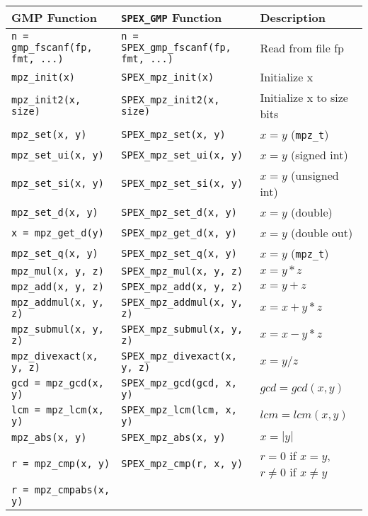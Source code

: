 \documentclass[12pt]{report}
\theoremstyle{definition}
\begin{document}
{\begin{center}
\begin{tabular}{|l|l|l|}
{\bf GMP Function} & \verb|SPEX_GMP| {\bf Function} & {\bf Description} \\
\hline\hline
\verb|n = gmp_fscanf(fp, fmt, ...)|
    & \verb|n = SPEX_gmp_fscanf(fp, fmt, ...)|
    & Read from file fp \\ \hline
\verb|mpz_init(x)|
    & \verb|SPEX_mpz_init(x)|
    & Initialize x \\ \hline
\verb|mpz_init2(x, size)|
    & \verb|SPEX_mpz_init2(x, size)|
    & Initialize x to size bits \\ \hline
\verb|mpz_set(x, y)|
    & \verb|SPEX_mpz_set(x, y)| 
    & $x = y$ (\verb|mpz_t|) \\ \hline
\verb|mpz_set_ui(x, y)|
    & \verb|SPEX_mpz_set_ui(x, y)|
    & $x = y$ (signed int) \\ \hline
\verb|mpz_set_si(x, y)|
    & \verb|SPEX_mpz_set_si(x, y)|
    & $x = y$ (unsigned int) \\ \hline
\verb|mpz_set_d(x, y)|
    & \verb|SPEX_mpz_set_d(x, y)|
    & $x = y$ (double)\\ \hline
\verb|x = mpz_get_d(y)|
    & \verb|SPEX_mpz_get_d(x, y)|
    & $x = y$ (double out) \\ \hline
\verb|mpz_set_q(x, y)|
    & \verb|SPEX_mpz_set_q(x, y)|
    & $x = y$ (\verb|mpz_t|) \\ \hline
\verb|mpz_mul(x, y, z)|
    & \verb|SPEX_mpz_mul(x, y, z)|
    & $x = y*z$ \\ \hline
\verb|mpz_add(x, y, z)|
    & \verb|SPEX_mpz_add(x, y, z)|
    & $x = y+z$ \\ \hline
\verb|mpz_addmul(x, y, z)|
    & \verb|SPEX_mpz_addmul(x, y, z)|
    & $x = x+y*z$ \\ \hline
\verb|mpz_submul(x, y, z)|
    & \verb|SPEX_mpz_submul(x, y, z)|
    & $x = x-y*z$ \\ \hline
\verb|mpz_divexact(x, y, z)|
    & \verb|SPEX_mpz_divexact(x, y, z)|
    & $x = y/z$ \\ \hline
\verb|gcd = mpz_gcd(x, y)|
    & \verb|SPEX_mpz_gcd(gcd, x, y)|
    & $gcd = gcd(x,y)$\\ \hline
\verb|lcm = mpz_lcm(x, y)|
    & \verb|SPEX_mpz_lcm(lcm, x, y)|
    & $lcm = lcm(x,y)$ \\ \hline
\verb|mpz_abs(x, y)|
    & \verb|SPEX_mpz_abs(x, y)|
    & $x = |y|$ \\ \hline
\verb|r = mpz_cmp(x, y)|
    & \verb|SPEX_mpz_cmp(r, x, y)|
    & $r = 0$ if $x=y$, $r\neq 0$  if $x\neq y$ \\ \hline
\verb|r = mpz_cmpabs(x, y)|

\end{tabular}
\end{center}}
\end{document}

